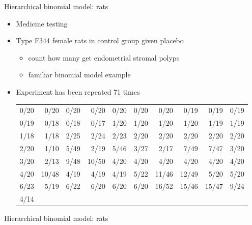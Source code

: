 \documentclass[finnish,english,t]{beamer}
\begin{document}
\begin{frame}{Hierarchical binomial model: rats}

  \begin{itemize}
  \item Medicine testing
  \item Type F344 female rats in control group given placebo
    \begin{itemize}
    \item count how many get endometrial stromal polyps
    \item familiar binomial model example
    \end{itemize}
  \item<2-> Experiment has been repeated 71 times
    {\scriptsize
      \begin{tabular}{r r r r r r r r r r}
        0/20 & 0/20 & 0/20 & 0/20 & 0/20 & 0/20 & 0/20 & 0/19 & 0/19 & 0/19 \\
        0/19 & 0/18 & 0/18 & 0/17 & 1/20 & 1/20 & 1/20 & 1/20 & 1/19 & 1/19 \\
        1/18 & 1/18 & 2/25 & 2/24 & 2/23 & 2/20 & 2/20 & 2/20 & 2/20 & 2/20 \\
        2/20 & 1/10 & 5/49 & 2/19 & 5/46 & 3/27 & 2/17 & 7/49 & 7/47 & 3/20 \\
        3/20 & 2/13 & 9/48 & 10/50 & 4/20 & 4/20 & 4/20 & 4/20 & 4/20 & 4/20 \\
        4/20 & 10/48 & 4/19 & 4/19 & 4/19 & 5/22 & 11/46 & 12/49 & 5/20 & 5/20 \\
        6/23 & 5/19 & 6/22 & 6/20 & 6/20 & 6/20 & 16/52 & 15/46 & 15/47 & 9/24 \\
        4/14 &      &      &      &      &      &       &       &       & 
      \end{tabular}}
  \end{itemize}
  
\end{frame}

\begin{frame}{Hierarchical binomial model: rats}


  
\end{frame}
\end{document}
